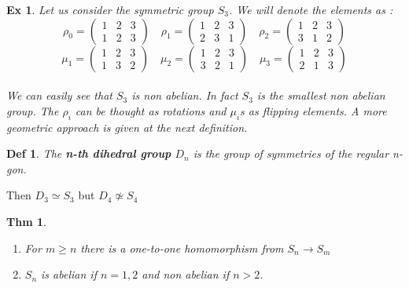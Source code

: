 \documentclass[paper=a4, fontsize=11pt]{scrartcl}
\newcommand{\nextline}{$ $ \newline \vspace{-0.15in}}
\newtheorem{theorem}{Thm}
\newtheorem{definition}{Def}
\newtheorem{example}{Ex}
\begin{document}
\begin{example}
	Let us consider the symmetric group $S_3$. We will denote the elements as : \\
	\begin{equation}\nonumber
		\rho_0 = 
		\begin{pmatrix}
		1 & 2 & 3 \\
		1 & 2 & 3 
		\end{pmatrix} \quad
		\rho_1 =
		\begin{pmatrix}
		1 & 2 & 3 \\
		2 & 3 & 1 
		\end{pmatrix}\quad
		\rho_2 =
		\begin{pmatrix}
		1 & 2 & 3 \\
		3 & 1 & 2 
		\end{pmatrix}
	\end{equation}
	\begin{equation}\nonumber
		\mu_1 = 
		\begin{pmatrix}
		1 & 2 & 3 \\
		1 & 3 & 2 
		\end{pmatrix} \quad
		\mu_2 = 
		\begin{pmatrix}
		1 & 2 & 3 \\
		3 & 2 & 1 
		\end{pmatrix} \quad
		\mu_3 = 
		\begin{pmatrix}
		1 & 2 & 3 \\
		2 & 1 & 3 
		\end{pmatrix}
	\end{equation}\\
	We can easily see that $S_3$ is non abelian. In fact $S_3$ is the smallest non abelian group. The $\rho_i$ can be thought as rotations and $\mu_i$s as flipping elements. A more geometric approach is given at the next definition.\\
\end{example}

\begin{definition}
The \textbf{n-th dihedral group} $D_n$ is the group of symmetries of the regular n-gon.\\
\end{definition}

Then $D_3 \simeq S_3$ but $D_4 \not\simeq S_4 $\\

\begin{theorem}
\nextline
\begin{enumerate}
	\item For $m \geq n$ there is a one-to-one homomorphism from $S_n \to S_m$
	\item $S_n$ is abelian if $n=1,2$ and non abelian if $n > 2$.\\
\end{enumerate}
\end{theorem}
\end{document}
